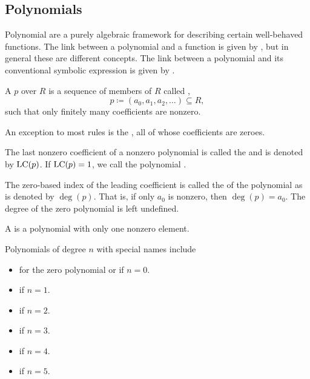 \subsection{Polynomials}\label{subsec:polynomials}

\begin{remark}\label{remark:polynomials_vs_polynomial_functions}
  Polynomial are a purely algebraic framework for describing certain well-behaved functions. The link between a polynomial and a function is given by , but in general these are different concepts. The link between a polynomial and its conventional symbolic expression is given by .
\end{remark}

\begin{definition}\label{def:polynomial}\cite[149]{Knapp2016BAlg}
  A  \( p \) over \( R \) is a sequence of members of \( R \) called ,
  \begin{equation*}
    p \coloneqq ( a_0, a_1, a_2, \ldots ) \subseteq R,
  \end{equation*}
  such that only finitely many coefficients are nonzero.

  \begin{defenum}
     An exception to most rules is the , all of whose coefficients are zeroes.

     The last nonzero coefficient of a nonzero polynomial is called the  and is denoted by \( \operatorname{LC}(p) \). If \( \operatorname{LC}(p) = 1 \), we call the polynomial .

     The zero-based index of the leading coefficient is called the  of the polynomial as is denoted by \( \deg(p) \). That is, if only \( a_0 \) is nonzero, then \( \deg(p) = a_0 \). The degree of the zero polynomial is left undefined.

     A  is a polynomial with only one nonzero element.

     Polynomials of degree \( n \) with special names include
    \begin{itemize}
      \item {} for the zero polynomial or if \( n = 0 \).
      \item {} if \( n = 1 \).
      \item {} if \( n = 2 \).
      \item {} if \( n = 3 \).
      \item {} if \( n = 4 \).
      \item {} if \( n = 5 \).
    \end{itemize}
  \end{defenum}
\end{definition}


